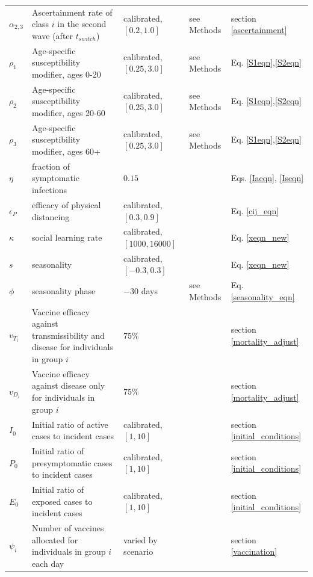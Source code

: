 \begin{table}[H]
\begin{tabular}{p{1cm} p{5cm} p{2cm} l l}
  $\alpha_{2,3}$ & Ascertainment rate of class $i$  in the second wave (after $t_{switch}$)& calibrated, $[0.2,1.0]$ & see Methods& section \ref{ascertainment} \\
  $\rho_1$ & Age-specific susceptibility modifier, ages 0-20 & calibrated, $[0.25,3.0]$  & see Methods& Eq. \ref{S1eqn},\ref{S2eqn} \\
  $\rho_2$ & Age-specific susceptibility modifier, ages 20-60 & calibrated, $[0.25,3.0]$  & see Methods& Eq. \ref{S1eqn},\ref{S2eqn} \\
  $\rho_3$ & Age-specific susceptibility modifier, ages 60+ & calibrated, $[0.25,3.0]$  & see Methods&  Eq. \ref{S1eqn},\ref{S2eqn}\\
  $\eta$ & fraction of symptomatic infections & $0.15$ & \cite{mizumoto2020estimating} & Eqs. \ref{Iaeqn}, \ref{Iseqn} \\
  $\epsilon_P$ & efficacy of physical distancing  & calibrated, $[0.3,0.9]$ & \cite{googlemobility, ontariocoviddata}  & Eq. \ref{cij_eqn}\\
  $\kappa$    & social learning rate   & calibrated, $[1000,16000]$ & \cite{googlemobility, ontariocoviddata} & Eq. \ref{xeqn_new} \\
  $ s $ & seasonality & calibrated, $[-0.3,0.3]$ & \cite{googlemobility, ontariocoviddata} & Eq. \ref{xeqn_new}\\
  $\phi$  & seasonality phase & $-30$ days & see Methods & Eq. \ref{seasonality_eqn} \\
  $ v_{T_i} $ & Vaccine efficacy against transmissibility and disease for individuals in group $i$  &  $75 \%$  & \cite{WHO_TPP} & section \ref{mortality_adjust}\\
  $ v_{D_i} $ & Vaccine efficacy against disease only for individuals in group $i$  &  $75 \%$  & \cite{WHO_TPP} &  section \ref{mortality_adjust} \\
  $ I_0 $ & Initial ratio of active cases to incident cases & calibrated, $[1,10]$ & \cite{googlemobility, ontariocoviddata} & section \ref{initial_conditions} \\
  $ P_0 $ & Initial ratio of presymptomatic cases to incident cases & calibrated, $[1,10]$ & & section \ref{initial_conditions}\\
  $ E_0 $ & Initial ratio of exposed cases to incident cases & calibrated, $[1,10]$ & & section \ref{initial_conditions}\\
  $\psi_i$ & Number of vaccines allocated for individuals in group $i$ each day & varied by scenario &  & section \ref{vaccination} \\

\end{tabular}
\end{table}
